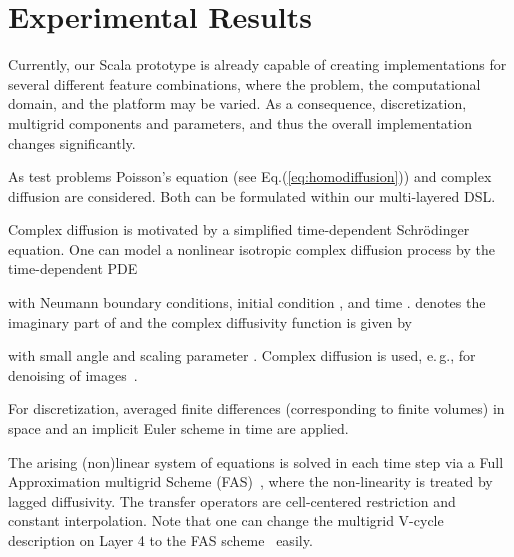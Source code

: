 \documentclass[onecolumn]{svjour3}
\newcommand{\refeqn}[1]{(\ref{#1})}
\begin{document}
\section{Experimental Results} \label{sec:exp}

Currently, our Scala prototype is already capable of creating implementations for several different feature combinations, where the problem, the computational domain, and the platform may be varied. As a consequence, discretization, multigrid components and parameters, and thus the overall implementation changes significantly.

As test problems Poisson's equation (see Eq.\refeqn{eq:homodiffusion}) and complex diffusion are considered. Both can be formulated within our multi-layered DSL.

Complex diffusion is motivated by a simplified time-dependent Schr\"odinger equation. One can model a nonlinear isotropic complex diffusion process by the time-dependent PDE

with Neumann boundary conditions, initial condition , and time .
 denotes the imaginary part of  and the complex diffusivity function is given by
 
with small angle  and scaling parameter . Complex diffusion is used, e.\,g., for denoising of images~\cite{gilboa2004,honigman2006}.

For discretization, averaged finite differences (corresponding to finite volumes) in space and an implicit Euler scheme in time are applied. 

The arising (non)linear system of equations is solved in each time step via a Full Approximation multigrid Scheme (FAS)~\cite{Trottenbergoosterlee01}, where the non-linearity is treated by lagged diffusivity. The transfer operators are cell-centered restriction and constant interpolation.
Note that one can change the multigrid V-cycle description on Layer 4 to the FAS scheme~\cite{Dietrich:2010:AWSEC10} easily.
\end{document}
